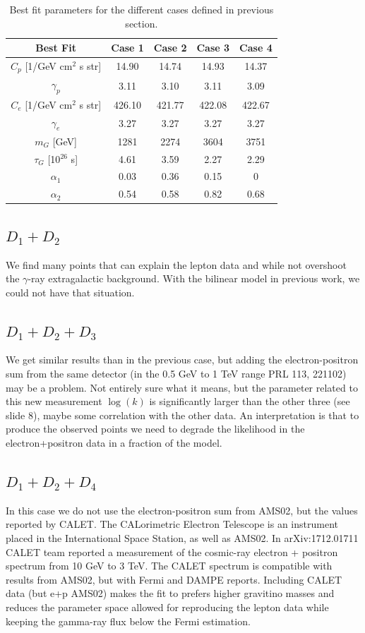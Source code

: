 \documentclass[a4paper,11pt]{article}
\begin{document}
\begin{table}
\centering{}%
\begin{tabular}{|c|c|c|c|c|}
\hline 
 Best Fit & Case 1 & Case 2 & Case 3 & Case 4 \tabularnewline
\hline 
\hline 
$C_p$ [1/GeV cm$^2$ s str] & 14.90 & 14.74 & 14.93 & 14.37 \tabularnewline
\hline 
$\gamma_p$ & 3.11 & 3.10 & 3.11 & 3.09  \tabularnewline
\hline 
$C_e$ [1/GeV cm$^2$ s str] & 426.10 & 421.77 & 422.08 & 422.67 \tabularnewline
\hline 
$\gamma_e$ & 3.27 & 3.27 & 3.27 & 3.27 \tabularnewline
\hline 
$m_G$ [GeV] & 1281 & 2274 & 3604 & 3751 \tabularnewline
\hline 
$\tau_G$ [10$^{26}$ s] & 4.61 & 3.59 & 2.27 & 2.29  \tabularnewline
\hline 
$\alpha_1$  & 0.03 &  0.36 & 0.15 &  0 \tabularnewline
\hline 
$\alpha_2$  & 0.54 &  0.58 & 0.82 & 0.68 \tabularnewline
\hline 
\end{tabular}
\caption{Best fit parameters for the different cases defined in previous section.}
\label{table:best-fit-summary}
\end{table}

\subsection{$D_1 + D_2$}

We find many points that can explain the lepton data and while not overshoot the $\gamma$-ray extragalactic background. With the bilinear model in previous work, we could not have that situation.

\subsection{$D_1 + D_2 + D_3$}

We get similar results than in the previous case, but adding the electron-positron sum from the same detector (in the 0.5 GeV to 1 TeV range PRL 113, 221102) may be a problem. Not entirely sure what it means, but the parameter related to this new measurement $\log(k)$ is significantly larger than the other three (see slide 8), maybe some correlation with the other data. An interpretation is that to produce the observed points we need to degrade the likelihood in the electron+positron data in a fraction of the model.

\subsection{$D_1 + D_2 + D_4$}

In this case we do not use the electron-positron sum from AMS02, but the values reported by CALET. The CALorimetric Electron Telescope is an instrument placed in the International Space Station, as well as AMS02. In arXiv:1712.01711 CALET team reported a measurement of the cosmic-ray electron + positron spectrum from 10 GeV to 3 TeV. The CALET spectrum is compatible with results from AMS02, but with Fermi and DAMPE reports. Including CALET data (but e+p AMS02) makes the fit to prefers higher gravitino masses and reduces the parameter space allowed for reproducing the lepton data while keeping the gamma-ray flux below the Fermi estimation.
\end{document}
